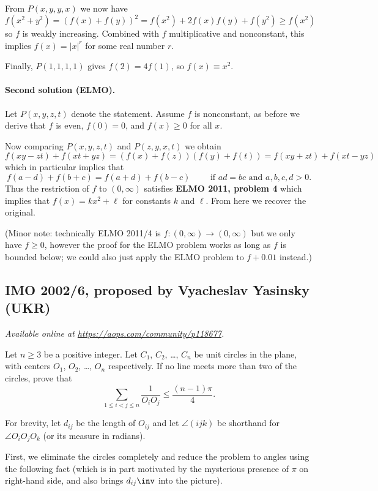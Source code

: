 \documentclass[11pt]{scrartcl}
\begin{document}
From $P(x,y,y,x)$ we now have
\[ f(x^2 + y^2) = \left( f(x) + f(y) \right)^2
  = f(x^2) + 2f(x)f(y) + f(y^2) \ge f(x^2) \]
so $f$ is weakly increasing.
Combined with $f$ multiplicative and nonconstant,
this implies $f(x) = |x|^r$ for some real number $r$.

Finally, $P(1,1,1,1)$ gives $f(2) = 4f(1)$,
so $f(x) \equiv x^2$.

\paragraph{Second solution (ELMO).}
Let $P(x,y,z,t)$ denote the statement.
Assume $f$ is nonconstant,
as before we derive that $f$ is even, $f(0) = 0$,
and $f(x) \ge 0$ for all $x$.

Now comparing $P(x,y,z,t)$ and $P(z,y,x,t)$ we obtain
\[ f(xy-zt) + f(xt+yz) =
  \left( f(x)+f(z) \right)
  \left( f(y)+f(t) \right)
  = f(xy+zt) + f(xt-yz) \]
which in particular implies that
\[ f(a-d) + f(b+c) = f(a+d) + f(b-c)
\qquad \text{ if } ad=bc \text{ and } a,b,c,d > 0. \]
Thus the restriction of $f$ to $(0,\infty)$ satisfies
\textbf{ELMO 2011, problem 4}
which implies that $f(x) = kx^2+\ell$ for constants $k$ and $\ell$.
From here we recover the original.

(Minor note: technically ELMO 2011/4 is $f \colon (0,\infty) \to (0,\infty)$
but we only have $f \ge 0$,
however the proof for the ELMO problem
works as long as $f$ is bounded below;
we could also just apply the ELMO problem to $f+0.01$ instead.)
\pagebreak

\subsection{IMO 2002/6, proposed by Vyacheslav Yasinsky (UKR)}
\textsl{Available online at \url{https://aops.com/community/p118677}.}
\begin{mdframed}[style=mdpurplebox,frametitle={Problem statement}]
Let $n \ge 3$ be a positive integer.
Let $C_1$, $C_2$, \dots, $C_n$ be unit circles in the plane,
with centers $O_1$, $O_2$, \dots, $O_n$ respectively.
If no line meets more than two of the circles, prove that
\[ \sum_{1 \le i < j \le n } \frac{1}{O_i O_j}
  \le \frac{(n-1)\pi}{4}. \]
\end{mdframed}
For brevity, let $d_{ij}$ be the length of $O_{ij}$
and let $\angle(ijk)$ be shorthand for $\angle O_i O_j O_k$
(or its measure in radians).

First, we eliminate the circles completely
and reduce the problem to angles using the following fact
(which is in part motivated by the mysterious
presence of $\pi$ on right-hand side,
and also brings $d_{ij}\inv$ into the picture).
\end{document}
